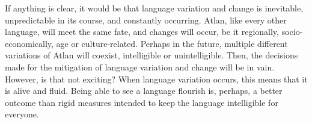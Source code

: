 If anything is clear, it would be that language variation and change is inevitable, unpredictable in its course, and constantly occurring. Atlan, like every other language, will meet the same fate, and changes will occur, be it regionally, socio-economically, age or culture-related. Perhaps in the future, multiple different variations of Atlan will coexist, intelligible or unintelligible. Then, the decisions made for the mitigation of language variation and change will be in vain. However, is that not exciting? When language variation occurs, this means that it is alive and fluid. Being able to see a language flourish is, perhaps, a better outcome than rigid measures intended to keep the language intelligible for everyone.


